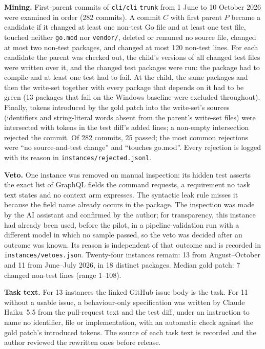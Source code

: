 \documentclass[10pt]{article}
\begin{document}
\textbf{Mining.} First-parent commits of \texttt{cli/cli} \texttt{trunk} from 1 June to 10 October 2026 were examined in order (282 commits). A commit $C$ with first parent $P$ became a candidate if it changed at least one non-test Go file and at least one test file, touched neither \texttt{go.mod} nor \texttt{vendor/}, deleted or renamed no source file, changed at most two non-test packages, and changed at most 120 non-test lines. For each candidate the parent was checked out, the child's versions of all changed test files were written over it, and the changed test packages were run: the package had to compile and at least one test had to fail. At the child, the same packages and then the write-set together with every package that depends on it had to be green (13 packages that fail on the Windows baseline were excluded throughout). Finally, tokens introduced by the gold patch into the write-set's sources (identifiers and string-literal words absent from the parent's write-set files) were intersected with tokens in the test diff's added lines; a non-empty intersection rejected the commit. Of 282 commits, 25 passed; the most common rejections were ``no source-and-test change'' and ``touches go.mod''. Every rejection is logged with its reason in \texttt{instances/rejected.jsonl}.

\textbf{Veto.} One instance was removed on manual inspection: its hidden test asserts the exact list of GraphQL fields the command requests, a requirement no task text states and no context arm expresses. The syntactic leak rule misses it because the field name already occurs in the package. The inspection was made by the AI assistant and confirmed by the author; for transparency, this instance had already been used, before the pilot, in a pipeline-validation run with a different model in which no sample passed, so the veto was decided after an outcome was known. Its reason is independent of that outcome and is recorded in \texttt{instances/vetoes.json}. Twenty-four instances remain: 13 from August--October and 11 from June--July 2026, in 18 distinct packages. Median gold patch: 7 changed non-test lines (range 1--108).

\textbf{Task text.} For 13 instances the linked GitHub issue body is the task. For 11 without a usable issue, a behaviour-only specification was written by Claude Haiku~5.5 from the pull-request text and the test diff, under an instruction to name no identifier, file or implementation, with an automatic check against the gold patch's introduced tokens. The source of each task text is recorded and the author reviewed the rewritten ones before release.
\end{document}

